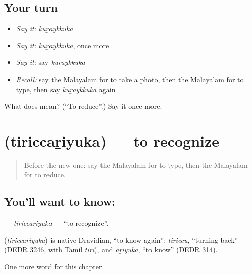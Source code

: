 \subsection*{Your turn}
\begin{itemize}
\raggedright
  \item \emph{Say it:} \emph{kuṟaykkuka}
  \item \emph{Say it:} \emph{kuṟaykkuka}, once more
  \item \emph{Say it:} say \emph{kuṟaykkuka}
  \item \emph{Recall:} say the Malayalam for to take a photo, then the Malayalam for to type, then say \emph{kuṟaykkuka} again
\end{itemize}

\begin{tcolorbox}[breakable,colback=teal!4,colframe=teal!35!black,title={Before you move on}]
What does  mean? (\textquotedblleft{}To reduce\textquotedblright{}.) Say it once more.
\end{tcolorbox}
\section[\texorpdfstring{\ml{തിരിച്ചറിയുക} (tiriccaṟiyuka)}{തിരിച്ചറിയുക (tiriccaṟiyuka)}]{ (tiriccaṟiyuka) — to recognize}

\label{lesson:ML-C309-tiriccariyuka}



\begin{quote}
Before the new one: say the Malayalam for to type, then the Malayalam for to reduce.
\end{quote}

\subsection*{You'll want to know: }
\textbf{} — \emph{tiriccaṟiyuka} — \textquotedblleft{}to recognize\textquotedblright{}.

\begin{cousinweb}
\textbf{} (\emph{tiriccaṟiyuka}) is native Dravidian, \textquotedblleft{}to know again\textquotedblright{}: \emph{tiriccu}, \textquotedblleft{}turning back\textquotedblright{} (DEDR 3246, with Tamil \emph{tiri}), and \emph{aṟiyuka}, \textquotedblleft{}to know\textquotedblright{} (DEDR 314).
\end{cousinweb}

\begin{grammarlens}[title={What you've built}]
One more word for this chapter.
\end{grammarlens}

